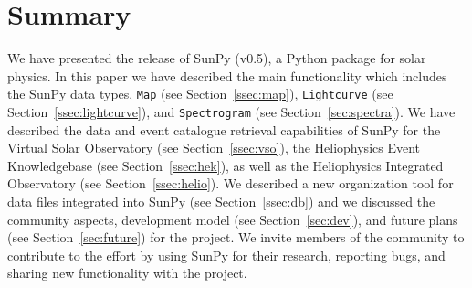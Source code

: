 \section{Summary}
We have presented the release of SunPy (v0.5), a Python package for solar physics. In
this paper we have described the main functionality which includes the SunPy data types, 
\texttt{Map} (see Section~\ref{ssec:map}), \texttt{Lightcurve} (see Section~\ref{ssec:lightcurve}), and \texttt{Spectrogram} (see Section~\ref{sec:spectra}).
We have described the data and event catalogue retrieval capabilities of SunPy for
the Virtual Solar Observatory (see Section~\ref{ssec:vso}), the Heliophysics Event Knowledgebase (see Section~\ref{ssec:hek}), as well as
the Heliophysics Integrated Observatory (see Section~\ref{ssec:helio}). We described
a new organization tool for data files integrated into SunPy (see Section~\ref{ssec:db}) 
and we discussed the community aspects, development model (see Section~\ref{sec:dev}), and future plans (see Section~\ref{sec:future}) for the project.
We invite members of the community to contribute to the effort by using SunPy for their 
research, reporting bugs, and sharing new functionality with the project.